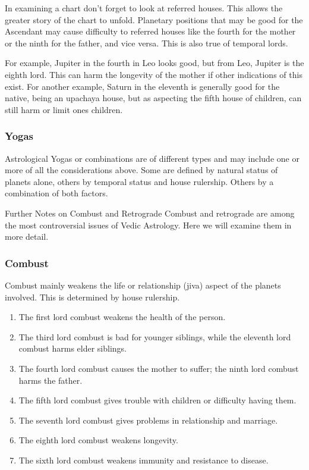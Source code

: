 In examining a chart don’t forget to look at referred houses. This allows the greater story of the chart to unfold. Planetary positions that may be good for the Ascendant may cause difficulty to referred houses like the fourth for the mother or the ninth for the father, and vice versa. This is also true of temporal lords.

 

For example, Jupiter in the fourth in Leo looks good, but from Leo, Jupiter is the eighth lord. This can harm the longevity of the mother if other indications of this exist. For another example, Saturn in the eleventh is generally good for the native, being an upachaya house, but as aspecting the fifth house of children, can still harm or limit ones children.

 

\subsubsection{Yogas}
 

Astrological Yogas or combinations are of different types and may include one or more of all the considerations above. Some are defined by natural status of planets alone, others by temporal status and house rulership. Others by a combination of both factors.

 

Further Notes on Combust and Retrograde
Combust and retrograde are among the most controversial issues of Vedic Astrology. Here we will examine them in more detail.

 

\subsubsection{Combust}

 

Combust mainly weakens the life or relationship (jiva) aspect of the planets involved. This is determined by house rulership.

 
\begin{enumerate}
\item The first lord combust weakens the health of the person.
\item The third lord combust is bad for younger siblings, while the eleventh lord combust harms elder siblings.
\item The fourth lord combust causes the mother to suffer; the ninth lord combust harms the father.
\item The fifth lord combust gives trouble with children or difficulty having them.
\item The seventh lord combust gives problems in relationship and marriage.
\item The eighth lord combust weakens longevity.
\item The sixth lord combust weakens immunity and resistance to disease.
\end{enumerate}

